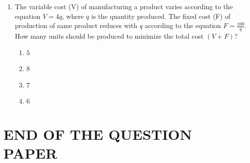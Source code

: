 \documentclass[journal,12pt,onecolumn]{IEEEtran}
\theoremstyle{remark}
\begin{document}
\begin{enumerate}
\item The variable cost (V) of manufacturing a product varies according to the equation $V = 4q$, where $q$ is the quantity produced. The fixed cost (F) of production of same product reduces with $q$ according to the equation $F = \frac{100}{q}$. How many units should be produced to minimize the total cost $(V + F)$?

\hfill{}
\begin{enumerate}
\item $5$
\item $8$
\item $7$
\item $6$
\end{enumerate}
\end{enumerate}

\section*{END OF THE QUESTION PAPER}
\end{document}
